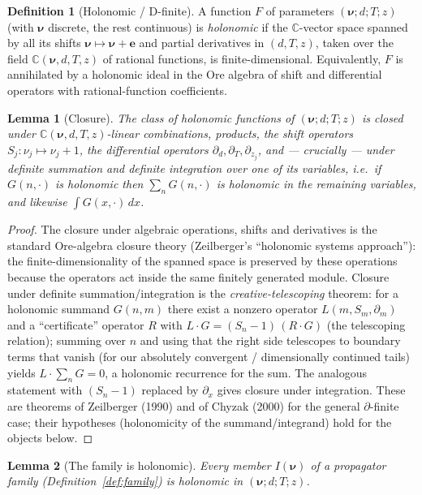 \documentclass{amsart}
\newtheorem{lemma}{Lemma}
\theoremstyle{definition}
\newtheorem{definition}{Definition}
\begin{document}
\begin{definition}[Holonomic / D-finite]
A function $F$ of parameters $(\boldsymbol\nu;d;T;z)$ (with $\boldsymbol\nu$
discrete, the rest continuous) is \emph{holonomic} if the $\mathbb C$-vector
space spanned by all its shifts $\boldsymbol\nu\mapsto\boldsymbol\nu+\mathbf e$
and partial derivatives in $(d,T,z)$, taken over the field
$\mathbb C(\boldsymbol\nu,d,T,z)$ of rational functions, is
finite-dimensional. Equivalently, $F$ is annihilated by a holonomic ideal in
the Ore algebra of shift and differential operators with rational-function
coefficients.
\end{definition}

\begin{lemma}[Closure]\label{lem:closure}
The class of holonomic functions of $(\boldsymbol\nu;d;T;z)$ is closed under
$\mathbb C(\boldsymbol\nu,d,T,z)$-linear combinations, products, the shift
operators $S_j:\nu_j\mapsto\nu_j+1$, the differential operators
$\partial_d,\partial_T,\partial_{z_j}$, and --- crucially --- under
\emph{definite summation and definite integration} over one of its variables,
i.e.\ if $G(n,\cdot)$ is holonomic then $\sum_n G(n,\cdot)$ is holonomic in the
remaining variables, and likewise $\int G(x,\cdot)\,dx$.
\end{lemma}

\begin{proof}
The closure under algebraic operations, shifts and derivatives is the standard
Ore-algebra closure theory (Zeilberger's ``holonomic systems approach''): the
finite-dimensionality of the spanned space is preserved by these operations
because the operators act inside the same finitely generated module.
Closure under definite summation/integration is the
\emph{creative-telescoping} theorem: for a holonomic summand $G(n,m)$ there
exist a nonzero operator $L(m,S_m,\partial_m)$ and a ``certificate'' operator
$R$ with $L\cdot G = (S_n-1)\,(R\cdot G)$ (the telescoping relation); summing
over $n$ and using that the right side telescopes to boundary terms that
vanish (for our absolutely convergent / dimensionally continued tails) yields
$L\cdot\sum_n G=0$, a holonomic recurrence for the sum. The analogous
statement with $(S_n-1)$ replaced by $\partial_x$ gives closure under
integration. These are theorems of Zeilberger (1990) and of Chyzak (2000) for
the general $\partial$-finite case; their hypotheses (holonomicity of the
summand/integrand) hold for the objects below.
\end{proof}

\begin{lemma}[The family is holonomic]\label{lem:familyholo}
Every member $I(\boldsymbol\nu)$ of a propagator family
(Definition~\ref{def:family}) is holonomic in $(\boldsymbol\nu;d;T;z)$.
\end{lemma}
\end{document}
